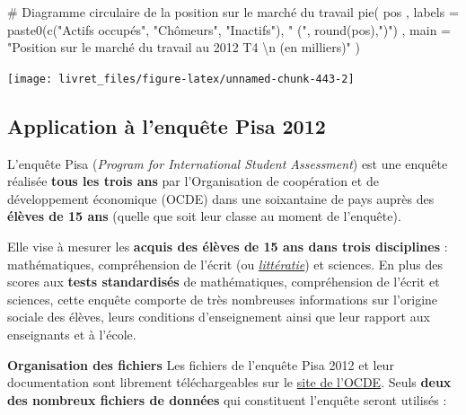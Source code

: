 \documentclass[12pt,twosided, notitlepage]{book}
\newenvironment{Shaded}{}{}
\newcommand{\KeywordTok}[1]{\textcolor[rgb]{0.00,0.00,1.00}{#1}}
\newcommand{\DataTypeTok}[1]{#1}
\newcommand{\CharTok}[1]{\textcolor[rgb]{0.00,0.50,0.50}{#1}}
\newcommand{\StringTok}[1]{\textcolor[rgb]{0.00,0.50,0.50}{#1}}
\newcommand{\CommentTok}[1]{\textcolor[rgb]{0.00,0.50,0.00}{#1}}
\newcommand{\NormalTok}[1]{#1}
\renewenvironment{Shaded}{\begin{snugshade}}{\end{snugshade}}
\begin{document}
\begin{itemize}
\begin{Shaded}
\begin{Highlighting}[]

\CommentTok{# Diagramme circulaire de la position sur le marché du travail}
\KeywordTok{pie}\NormalTok{(}
\NormalTok{  pos}
\NormalTok{  , }\DataTypeTok{labels =} \KeywordTok{paste0}\NormalTok{(}\KeywordTok{c}\NormalTok{(}\StringTok{"Actifs occupés"}\NormalTok{, }\StringTok{"Chômeurs"}\NormalTok{, }\StringTok{"Inactifs"}\NormalTok{), }\StringTok{" ("}\NormalTok{, }\KeywordTok{round}\NormalTok{(pos),}\StringTok{")"}\NormalTok{)}
\NormalTok{  , }\DataTypeTok{main =} \StringTok{"Position sur le marché du travail au 2012 T4 }\CharTok{\textbackslash{}n}\StringTok{ (en milliers)"}
\NormalTok{)}
\end{Highlighting}
\end{Shaded}

  \begin{center}\texttt{[image: livret\_files/figure-latex/unnamed-chunk-443-2]} \end{center}
\end{itemize}

\subsection{Application à l'enquête Pisa
2012}\label{application-a-lenquete-pisa-2012}

L'enquête Pisa (\textit{Program for International Student Assessment})
est une enquête réalisée \textbf{tous les trois ans} par l'Organisation
de coopération et de développement économique (OCDE) dans une
soixantaine de pays auprès des \textbf{élèves de 15 ans} (quelle que
soit leur classe au moment de l'enquête).

Elle vise à mesurer les \textbf{acquis des élèves de 15 ans dans trois
disciplines} : mathématiques, compréhension de l'écrit (ou
\href{https://fr.wikipedia.org/wiki/Litt\%C3\%A9ratie}{\emph{littératie}})
et sciences. En plus des scores aux \textbf{tests standardisés} de
mathématiques, compréhension de l'écrit et sciences, cette enquête
comporte de très nombreuses informations sur l'origine sociale des
élèves, leurs conditions d'enseignement ainsi que leur rapport aux
enseignants et à l'école.

\textbf{Organisation des fichiers} Les fichiers de l'enquête Pisa 2012
et leur documentation sont librement téléchargeables sur le
\href{http://www.oecd.org/pisa/pisaproducts/pisa2012database-downloadabledata.htm}{site
de l'OCDE}. Seuls \textbf{deux des nombreux fichiers de données} qui
constituent l'enquête seront utilisés :
\end{document}
